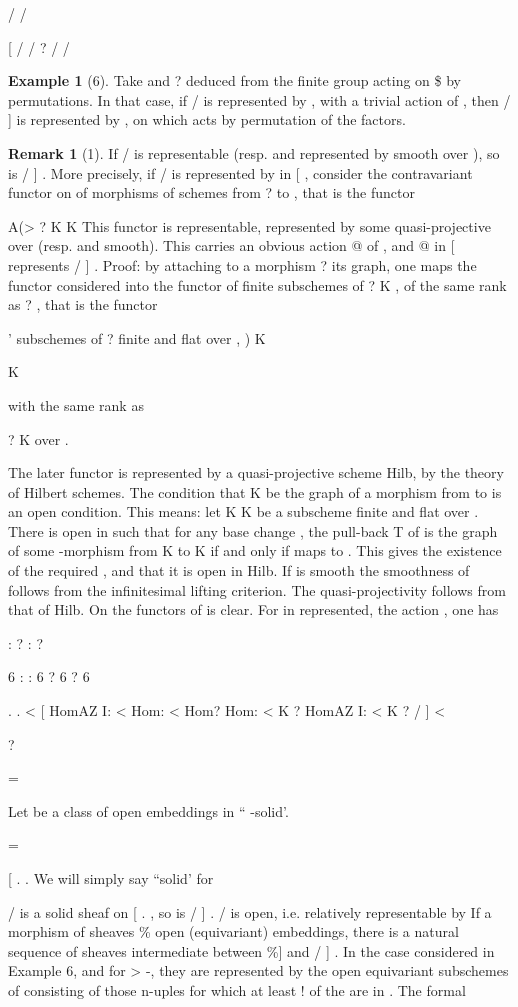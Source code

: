 \documentclass[11pt,a4paper]{article}
\theoremstyle{plain}
\theoremstyle{definition}
\newtheorem{example}[theorem]{Example}
\newtheorem{remark}[theorem]{Remark}
\begin{document}
/
 /

[
/
 / ?  /
/
\begin{example}[6]
Take and ? deduced from the finite group  acting on   \$
by permutations. In that case, if / is represented by  , with a trivial action of  ,
then / ] is represented by   , on which  acts by permutation of the factors.
\end{example}

\begin{remark}[1]
If / is representable (resp. and represented by  smooth over  ), so is
/ ] . More precisely, if / is represented by  in [ , consider the contravariant
functor on   of morphisms of schemes from ? to  , that is the functor



  A(> ? K   K 
This functor is representable, represented by some  quasi-projective over  (resp.
and smooth). This  carries an obvious action @ of , and  @ in [ represents
/ ] . Proof: by attaching to a morphism ?  its graph, one maps the functor
considered into the functor of finite subschemes of ? K  , of the same rank as ? ,
that is the functor



' subschemes of ?     finite and flat over  , )
K

K

with the same rank as

? K  over  .

The later functor is represented by a quasi-projective scheme Hilb, by the theory of
Hilbert schemes. The condition that  K be the graph of a morphism from
to is an open condition. This means: let 
K K be a subscheme
finite and flat over . There is  open in such that for any base change
,
the pull-back T of is the graph of some -morphism from K to
K
if and only if maps to  . This gives the existence of the required , and that it
is open in Hilb. If is smooth the smoothness of follows from the infinitesimal
lifting criterion. The quasi-projectivity follows from that of Hilb. On the functors
 of is clear. For in
represented, the action
, one has

: ? 
: ?  



6
: :
6
? 6 ?
6




. .
< [
HomAZ I: <   Hom: < Hom?  Hom: < K ? 
HomAZ I: < K ?  / ] < 

? 

=

Let be a class of open embeddings in
`` -solid'.

=




[ .   . We will simply say ``solid' for

/ is a solid sheaf on [ .   , so is / ] .
/ is open, i.e. relatively representable by
If a morphism of sheaves \%
open (equivariant) embeddings, there is a natural sequence of sheaves intermediate between \%] and / ] . In the case considered in Example 6, and for >
-,
they are represented by the open equivariant subschemes   of   consisting
of those n-uples      for which at least ! of the  are in  . The formal

\end{remark}
\end{document}
